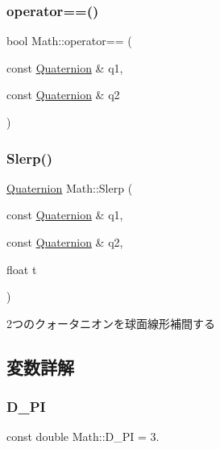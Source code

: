 \mbox{\label{namespace_math_a9180235433724422d304ae5bb9c96654}} 
\subsubsection{\texorpdfstring{operator==()}{operator==()}\hspace{0.1cm}{\footnotesize\ttfamily [6/6]}}
{\footnotesize\ttfamily bool Math\+::operator== (\begin{DoxyParamCaption}\item[{const \mbox{\hyperlink{struct_math_1_1_quaternion}{Quaternion}} \&}]{q1,  }\item[{const \mbox{\hyperlink{struct_math_1_1_quaternion}{Quaternion}} \&}]{q2 }\end{DoxyParamCaption})}

\mbox{\label{namespace_math_a718b7874df36cd0c5a220f6404c315f8}} 
\subsubsection{\texorpdfstring{Slerp()}{Slerp()}}
{\footnotesize\ttfamily \mbox{\hyperlink{struct_math_1_1_quaternion}{Quaternion}} Math\+::\+Slerp (\begin{DoxyParamCaption}\item[{const \mbox{\hyperlink{struct_math_1_1_quaternion}{Quaternion}} \&}]{q1,  }\item[{const \mbox{\hyperlink{struct_math_1_1_quaternion}{Quaternion}} \&}]{q2,  }\item[{float}]{t }\end{DoxyParamCaption})}



2つのクォータニオンを球面線形補間する 



\subsection{変数詳解}
\mbox{\label{namespace_math_a443fa0e652be63da57292b24faba00da}} 
\subsubsection{\texorpdfstring{D\+\_\+\+PI}{D\_PI}}
{\footnotesize\ttfamily const double Math\+::\+D\+\_\+\+PI = 3.}

